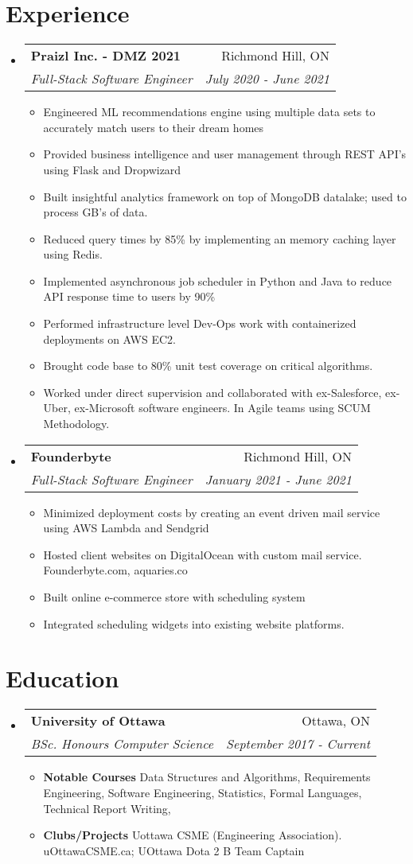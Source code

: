 \documentclass[letterpaper,11pt]{article}
\makeatletter
\newcommand{\resumeItem}[2]{
  \item\small{
    \textbf{#1}{#2 \vspace{-2pt}}
  }
}
\newcommand{\resumeSubheading}[4]{
  \vspace{-1pt}\item
    \begin{tabular*}{0.97\textwidth}[t]{l@{\extracolsep{\fill}}r}
      \textbf{#1} & #2 \\
      \textit{\small#3} & \textit{\small #4} \\
    \end{tabular*}\vspace{-5pt}
}
\newcommand{\resumeSubHeadingListStart}{\begin{itemize}[leftmargin=*]}
\newcommand{\resumeSubHeadingListEnd}{\end{itemize}}
\newcommand{\resumeItemListStart}{\begin{itemize}}
\newcommand{\resumeItemListEnd}{\end{itemize}\vspace{-5pt}}
\makeatother
\begin{document}
\section{Experience}
  \resumeSubHeadingListStart
	\resumeSubheading
	{Praizl Inc. - DMZ 2021}{Richmond Hill, ON}
	{Full-Stack Software Engineer}{July 2020 - June 2021}
		\resumeItemListStart
			\resumeItem{}
			{Engineered ML recommendations engine using multiple data sets to accurately match users to their dream homes}
			\resumeItem{}
			{Provided business intelligence and user management through REST API's using Flask and Dropwizard}
			\resumeItem{}
			{Built insightful analytics framework on top of MongoDB datalake; used to process GB's of data.}
			\resumeItem{}
			{Reduced query times by 85\% by implementing an memory caching layer using Redis.}
			\resumeItem{}
			{Implemented asynchronous job scheduler in Python and Java to reduce API response time to users by 90\%}
			\resumeItem{}
			{Performed infrastructure level Dev-Ops work with containerized deployments on AWS EC2. }
			\resumeItem{}
			{Brought code base to 80\% unit test coverage on critical algorithms. }
			\resumeItem{}
			{Worked under direct supervision and collaborated with ex-Salesforce, ex-Uber, ex-Microsoft software engineers. In Agile teams using SCUM Methodology. }
		\resumeItemListEnd
	    \resumeSubheading
	      {Founderbyte}{Richmond Hill, ON}
	      {Full-Stack Software Engineer}{January 2021 - June 2021}
	      \resumeItemListStart
		  \resumeItem{}
	          {Minimized deployment costs by creating an event driven mail service using AWS Lambda and Sendgrid}
	        \resumeItem{}
	          {Hosted client websites on DigitalOcean with custom mail service. Founderbyte.com, aquaries.co}
          \resumeItem{}
          {Built online e-commerce store with scheduling system}
          \resumeItem{}
          {Integrated scheduling widgets into existing website platforms.}
  
\resumeItemListEnd

\resumeSubHeadingListEnd

\section{Education}
  \resumeSubHeadingListStart
    \resumeSubheading
      {University of Ottawa}{Ottawa, ON}
      {BSc. Honours Computer Science}{September 2017 - Current}
	\resumeItemListStart
		\resumeItem{Notable Courses }
		{Data Structures and Algorithms, Requirements Engineering, Software Engineering, Statistics, Formal Languages, Technical Report Writing, }
	\resumeItem{Clubs/Projects }
		{Uottawa CSME (Engineering Association). uOttawaCSME.ca; UOttawa Dota 2 B Team Captain}
	\resumeItemListEnd
  \resumeSubHeadingListEnd
\end{document}
